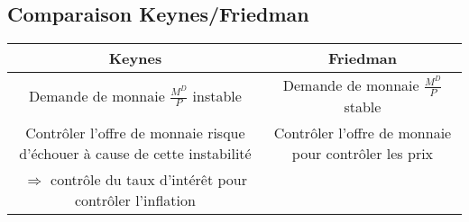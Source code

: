 	\subsection{Comparaison Keynes/Friedman}
	
	\begin{tabular}{|c|c|}
	\hline 
	Keynes & Friedman \\ 
	\hline 
	Demande de monnaie $\frac{M^D}{P}$ instable & Demande de monnaie $\frac{M^D}{P}$ stable \\ 
	\hline 
	Contrôler l'offre de monnaie risque d'échouer à cause de cette instabilité & Contrôler l'offre de monnaie pour contrôler les prix \\ 
	\hline 
	$\Rightarrow$ contrôle du taux d'intérêt pour contrôler l'inflation &  \\ 
	\hline 
	\end{tabular} 